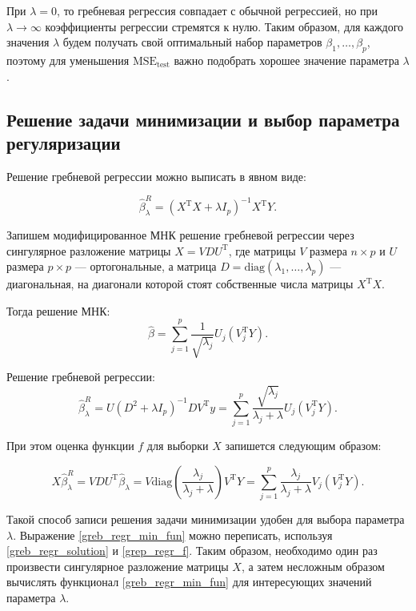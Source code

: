 \documentclass[specialist,
               subf,href,colorlinks=true, 12pt,a4paper]{article} %
\newcommand{\T}{\mathrm{T}}
\numberwithin{equation}{section}
\begin{document}
При $\lambda = 0$, то гребневая регрессия совпадает с обычной регрессией, но при $\lambda \rightarrow \infty$ коэффициенты регрессии стремятся к нулю. Таким образом, для каждого значения $\lambda$ будем получать свой оптимальный набор параметров $\beta_1, \ldots, \beta_p$, поэтому для уменьшения $\mathrm{MSE}_{\mathrm{test}}$ важно подобрать хорошее значение параметра $\lambda$. 

\subsection{Решение задачи минимизации и выбор параметра регуляризации}


Решение гребневой регрессии можно выписать в явном виде:

\begin{equation}\label{greb_regr_min_fun}
\hat{\beta}_{\lambda}^{R} = (X^{\mathrm{T}}X+ \lambda I_p)^{-1} X^{\mathrm{T}}Y.
\end{equation}

Запишем модифицированное МНК решение гребневой регрессии через сингулярное разложение матрицы $X = VDU^{\T}$, где матрицы $V$ размера $n \times p$ и $U$ размера $p \times p$ --- ортогональные, а матрица $D = \mathrm{diag}(\lambda_1, \ldots, \lambda_p)$ --- диагональная, на диагонали которой стоят собственные числа матрицы $X^{\T}X$.

Тогда решение МНК:
\begin{equation*}
\hat{\beta} = \sum_{j=1}^p \frac{1}{\sqrt{\lambda_j}} U_j(V_j^{\T}Y).
\end{equation*}

Решение гребневой регрессии:
\begin{equation}\label{greb_regr_solution}
\hat{\beta}_{\lambda}^{R} = U(D^2 + \lambda I_p)^{-1}DV^{\T}y = \sum_{j=1}^p \frac{\sqrt{\lambda_j}}{\lambda_j + \lambda} U_j(V_j^{\T}Y).
\end{equation}

При этом оценка функции $f$ для выборки $X$ запишется следующим образом:

\begin{equation}\label{grep_regr_f}
X\hat{\beta}_{\lambda}^{R} = VDU^{\T}\hat{\beta}_{\lambda} = V \mathrm{diag}(\frac{\lambda_j}{\lambda_j + \lambda}) V^{\T}Y = \sum_{j=1}^p \frac{\lambda_j}{\lambda_j + \lambda} V_j(V_j^{\T}Y).
\end{equation}

Такой способ записи решения задачи минимизации удобен для выбора параметра $\lambda$.  Выражение \eqref{greb_regr_min_fun} можно переписать, используя  \eqref{greb_regr_solution} и \eqref{grep_regr_f}. Таким образом, необходимо один раз произвести сингулярное разложение матрицы $X$, а затем несложным образом вычислять функционал \eqref{greb_regr_min_fun} для интересующих значений параметра $\lambda$. 
\end{document}
